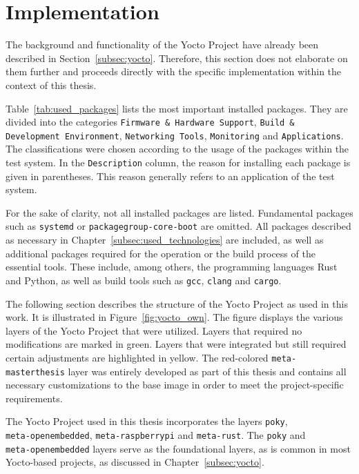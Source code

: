 \section{Implementation}
The background and functionality of the Yocto Project have already been described in Section~\ref{subsec:yocto}.  
Therefore, this section does not elaborate on them further and proceeds directly with the specific implementation within the context of this thesis.  

Table~\ref{tab:used_packages} lists the most important installed packages.  
They are divided into the categories \texttt{Firmware \& Hardware Support}, \texttt{Build \& Development Environment}, \texttt{Networking Tools}, \texttt{Monitoring} and \texttt{Applications}.  
The classifications were chosen according to the usage of the packages within the test system.  
In the \texttt{Description} column, the reason for installing each package is given in parentheses.  
This reason generally refers to an application of the test system.  

For the sake of clarity, not all installed packages are listed.  
Fundamental packages such as \texttt{systemd} or \texttt{packagegroup-core-boot} are omitted.  
All packages described as necessary in Chapter~\ref{subsec:used_technologies} are included, as well as additional packages required for the operation or the build process of the essential tools.  
These include, among others, the programming languages Rust and Python, as well as build tools such as \texttt{gcc}, \texttt{clang} and \texttt{cargo}.  

The following section describes the structure of the Yocto Project as used in this work.  
It is illustrated in Figure~\ref{fig:yocto_own}.  
The figure displays the various layers of the Yocto Project that were utilized.  
Layers that required no modifications are marked in green.  
Layers that were integrated but still required certain adjustments are highlighted in yellow.  
The red-colored \texttt{meta-masterthesis} layer was entirely developed as part of this thesis and contains all necessary customizations to the base image in order to meet the project-specific requirements.  

The Yocto Project used in this thesis incorporates the layers \texttt{poky}, \\
\texttt{meta-openembedded}, \texttt{meta-raspberrypi} and \texttt{meta-rust}.  
The \texttt{poky} and \\
\texttt{meta-openembedded} layers serve as the foundational layers, as is common in most Yocto-based projects, as discussed in Chapter~\ref{subsec:yocto}.  

